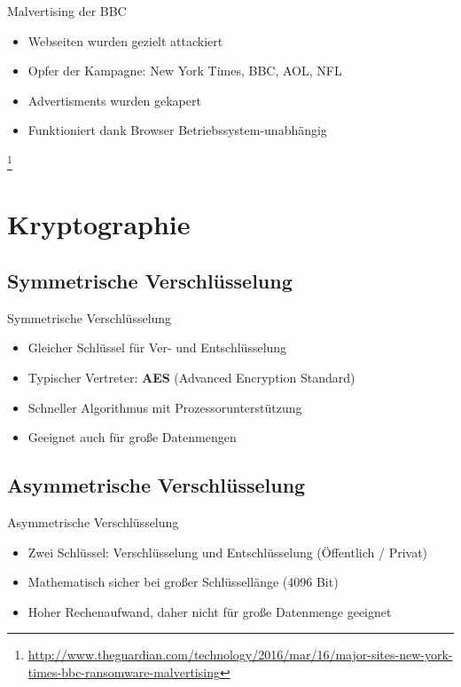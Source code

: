\documentclass[notes,10pt]{beamer}
\begin{document}
\begin{frame}{Malvertising der BBC}

	\begin{itemize}
		\item Webseiten wurden gezielt attackiert
		\item Opfer der Kampagne: New York Times, BBC, AOL, NFL
		\item Advertisments wurden gekapert
		\item Funktioniert dank Browser Betriebssystem-unabhängig
	\end{itemize}
	\let\thefootnote\relax\footnote{\url{http://www.theguardian.com/technology/2016/mar/16/major-sites-new-york-times-bbc-ransomware-malvertising}}
\end{frame}

\section{Kryptographie}
\subsection{Symmetrische Verschlüsselung}
\begin{frame}{Symmetrische Verschlüsselung}
	\begin{itemize}
		\item Gleicher Schlüssel für Ver- und Entschlüsselung
		\item Typischer Vertreter: \textbf{AES} (Advanced Encryption Standard)
		\item Schneller Algorithmus mit Prozessorunterstützung
		\item Geeignet auch für große Datenmengen
	\end{itemize}
\end{frame}
\subsection{Asymmetrische Verschlüsselung}
\begin{frame}{Asymmetrische Verschlüsselung}
	\begin{itemize}
		\item Zwei Schlüssel: Verschlüsselung und Entschlüsselung (Öffentlich / Privat)
		\item Mathematisch sicher bei großer Schlüssellänge (4096 Bit)
		\item Hoher Rechenaufwand, daher nicht für große Datenmenge geeignet
	\end{itemize}
\end{frame}
\end{document}
